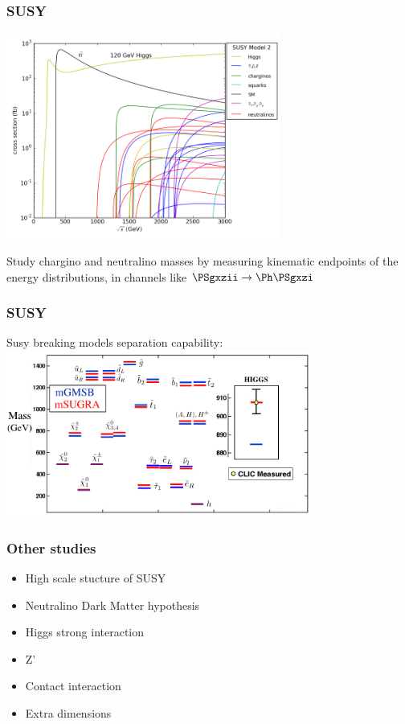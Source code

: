 \documentclass{beamer}
\begin{document}
\begin{frame}
\frametitle{SUSY}
\begin{center}
\includegraphics[width=9cm]{../SIDWorkshop/susy_model2.png}
\end{center}
Study chargino and neutralino masses by measuring kinematic endpoints of the
energy distributions, in channels like $\PSgxzii \to \Ph \PSgxzi$

\end{frame}
\begin{frame}
\frametitle{SUSY}
Susy breaking models separation capability:
\includegraphics[width=10cm]{../SIDWorkshop/GvM.png}
\end{frame}
\begin{frame}
\frametitle{Other studies}
\begin{itemize}
  \item High scale stucture of SUSY
  \item Neutralino Dark Matter hypothesis
  \item Higgs strong interaction
  \item Z'
  \item Contact interaction
  \item Extra dimensions
\end{itemize}
\end{frame}
\end{document}
